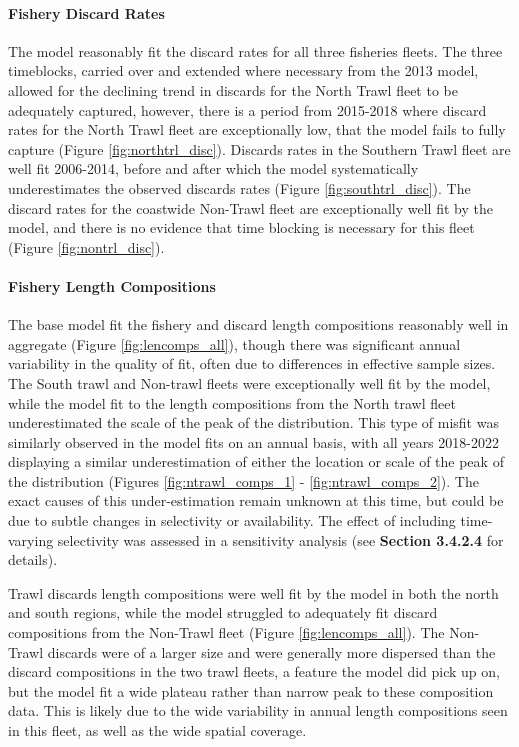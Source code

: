 \documentclass[11pt,
  english,
  letterpaper,
]{article}
\begin{document}
\hypertarget{fishery-discard-rates}{%
\paragraph{Fishery Discard Rates}\label{fishery-discard-rates}}

The model reasonably fit the discard rates for all three fisheries fleets. The three timeblocks, carried over and extended where necessary from the 2013 model, allowed for the declining trend in discards for the North Trawl fleet to be adequately captured, however, there is a period from 2015-2018 where discard rates for the North Trawl fleet are exceptionally low, that the model fails to fully capture (Figure \ref{fig:northtrl_disc}). Discards rates in the Southern Trawl fleet are well fit 2006-2014, before and after which the model systematically underestimates the observed discards rates (Figure \ref{fig:southtrl_disc}). The discard rates for the coastwide Non-Trawl fleet are exceptionally well fit by the model, and there is no evidence that time blocking is necessary for this fleet (Figure \ref{fig:nontrl_disc}).

\hypertarget{fishery-length-compositions-1}{%
\paragraph{Fishery Length Compositions}\label{fishery-length-compositions-1}}

The base model fit the fishery and discard length compositions reasonably well in aggregate (Figure \ref{fig:lencomps_all}), though there was significant annual variability in the quality of fit, often due to differences in effective sample sizes. The South trawl and Non-trawl fleets were exceptionally well fit by the model, while the model fit to the length compositions from the North trawl fleet underestimated the scale of the peak of the distribution. This type of misfit was similarly observed in the model fits on an annual basis, with all years 2018-2022 displaying a similar underestimation of either the location or scale of the peak of the distribution (Figures \ref{fig:ntrawl_comps_1} - \ref{fig:ntrawl_comps_2}). The exact causes of this under-estimation remain unknown at this time, but could be due to subtle changes in selectivity or availability. The effect of including time-varying selectivity was assessed in a sensitivity analysis (see \textbf{Section 3.4.2.4} for details).

Trawl discards length compositions were well fit by the model in both the north and south regions, while the model struggled to adequately fit discard compositions from the Non-Trawl fleet (Figure \ref{fig:lencomps_all}). The Non-Trawl discards were of a larger size and were generally more dispersed than the discard compositions in the two trawl fleets, a feature the model did pick up on, but the model fit a wide plateau rather than narrow peak to these composition data. This is likely due to the wide variability in annual length compositions seen in this fleet, as well as the wide spatial coverage.
\end{document}
